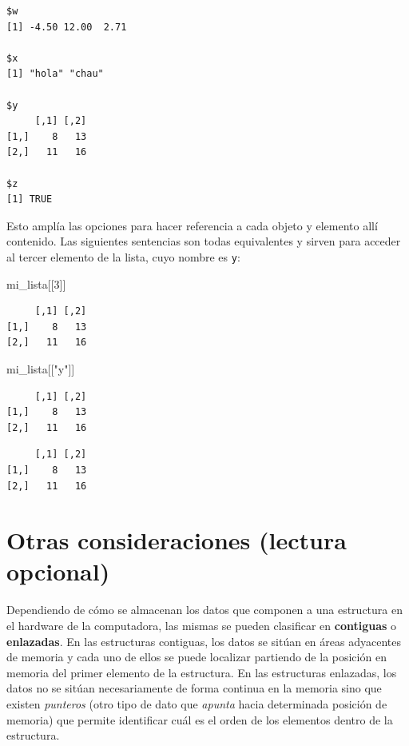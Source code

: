 \documentclass[
]{book}
\newenvironment{Shaded}{\begin{snugshade}}{\end{snugshade}}
\newcommand{\DecValTok}[1]{\textcolor[rgb]{0.00,0.00,0.81}{#1}}
\newcommand{\NormalTok}[1]{#1}
\newcommand{\SpecialCharTok}[1]{\textcolor[rgb]{0.00,0.00,0.00}{#1}}
\newcommand{\StringTok}[1]{\textcolor[rgb]{0.31,0.60,0.02}{#1}}
\begin{document}
\begin{verbatim}
$w
[1] -4.50 12.00  2.71

$x
[1] "hola" "chau"

$y
     [,1] [,2]
[1,]    8   13
[2,]   11   16

$z
[1] TRUE
\end{verbatim}

Esto amplía las opciones para hacer referencia a cada objeto y elemento allí contenido. Las siguientes sentencias son todas equivalentes y sirven para acceder al tercer elemento de la lista, cuyo nombre es \texttt{y}:

\begin{Shaded}
\begin{Highlighting}[]
\NormalTok{mi\_lista[[}\DecValTok{3}\NormalTok{]]}
\end{Highlighting}
\end{Shaded}

\begin{verbatim}
     [,1] [,2]
[1,]    8   13
[2,]   11   16
\end{verbatim}

\begin{Shaded}
\begin{Highlighting}[]
\NormalTok{mi\_lista[[}\StringTok{"y"}\NormalTok{]]}
\end{Highlighting}
\end{Shaded}

\begin{verbatim}
     [,1] [,2]
[1,]    8   13
[2,]   11   16
\end{verbatim}

\begin{Shaded}
\end{Shaded}

\begin{verbatim}
     [,1] [,2]
[1,]    8   13
[2,]   11   16
\end{verbatim}

\hypertarget{otras-consideraciones-lectura-opcional}{%
\section{Otras consideraciones (lectura opcional)}\label{otras-consideraciones-lectura-opcional}}

Dependiendo de cómo se almacenan los datos que componen a una estructura en el hardware de la computadora, las mismas se pueden clasificar en \textbf{contiguas} o \textbf{enlazadas}. En las estructuras contiguas, los datos se sitúan en áreas adyacentes de memoria y cada uno de ellos se puede localizar partiendo de la posición en memoria del primer elemento de la estructura. En las estructuras enlazadas, los datos no se sitúan necesariamente de forma continua en la memoria sino que existen \emph{punteros} (otro tipo de dato que \emph{apunta} hacia determinada posición de memoria) que permite identificar cuál es el orden de los elementos dentro de la estructura.
\end{document}
